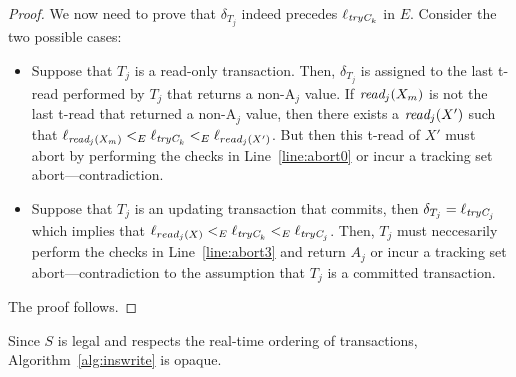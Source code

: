 \begin{proof}
We now need to prove that $\delta_{T_{j}}$ indeed precedes $\ell_{\textit{tryC}_k}$ in $E$.
Consider the two possible cases:
%
\begin{itemize}
\item
Suppose that $T_j$ is a read-only transaction. 
Then, $\delta_{T_j}$ is assigned to the last t-read performed by $T_j$ that returns a non-A$_j$ value. 
If $\textit{read}_j(X_m)$ is not the last t-read that returned a non-A$_j$ value, then there exists a $\textit{read}_j(X')$ such that 
$\ell_{\textit{read}_j(X_m)} <_{E} \ell_{\textit{tryC}_k} <_E \ell_{read_j(X')}$.
But then this t-read of $X'$ must abort by performing the checks in Line~\ref{line:abort0} or incur a tracking set abort---contradiction.
\item
Suppose that $T_j$ is an updating transaction that commits, then $\delta_{T_j}=\ell_{\textit{tryC}_j}$ which implies that
$\ell_{read_j(X)} <_{E} \ell_{\textit{tryC}_k} <_E \ell_{\textit{tryC}_j}$. Then, $T_j$ must neccesarily perform the checks
in Line~\ref{line:abort3} and return $A_j$ or incur a tracking set abort---contradiction to the assumption that $T_j$ is a committed transaction.
\end{itemize}
%
The proof follows.
%
\end{proof}
%
Since $S$ is legal and respects the real-time ordering of transactions, Algorithm~\ref{alg:inswrite} is opaque.
%
